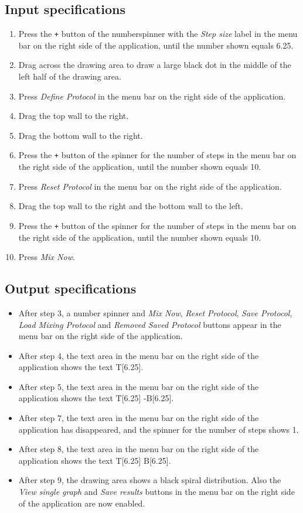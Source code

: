 \subsection*{Input specifications}
\begin{enumerate}
\item Press the \texttt{+} button of the numberspinner with the \emph{Step size} label in the menu bar on the right side of the application, until the number shown equals 6.25.
\item Drag across the drawing area to draw a large black dot in the middle of the left half of the drawing area.
\item Press \emph{Define Protocol} in the menu bar on the right side of the application.
\item Drag the top wall to the right.
\item Drag the bottom wall to the right.
\item Press the \texttt{+} button of the spinner for the number of steps in the menu bar on the right side of the application, until the number shown equals 10.
\item Press \emph{Reset Protocol} in the menu bar on the right side of the application.
\item Drag the top wall to the right and the bottom wall to the left.
\item Press the \texttt{+} button of the spinner for the number of steps in the menu bar on the right side of the application, until the number shown equals 10.
\item Press \emph{Mix Now}.
\end{enumerate}

\subsection*{Output specifications}
\begin{itemize}
\item After step 3, a number spinner and \emph{Mix Now}, \emph{Reset Protocol}, \emph{Save Protocol}, \emph{Load Mixing Protocol} and \emph{Removed Saved Protocol} buttons appear in the menu bar on the right side of the application.
\item After step 4, the text area in the menu bar on the right side of the application shows the text T[6.25].
\item After step 5, the text area in the menu bar on the right side of the application shows the text T[6.25] -B[6.25].
\item After step 7, the text area in the menu bar on the right side of the application has disappeared, and the spinner for the number of steps shows 1.
\item After step 8, the text area in the menu bar on the right side of the application shows the text T[6.25] B[6.25].
\item After step 9, the drawing area shows a black spiral distribution. Also the \emph{View single graph} and \emph{Save results} buttons in the menu bar on the right side of the application are now enabled.
\end{itemize}

